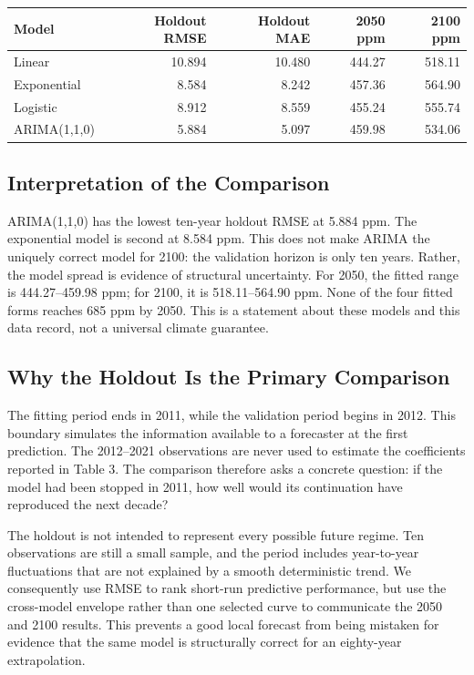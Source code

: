\documentclass{mcmthesis}
\begin{document}
\begin{table}[H]
\centering
\small
\begin{tabularx}{\textwidth}{lrrrr}
\toprule
Model & Holdout RMSE & Holdout MAE & 2050 ppm & 2100 ppm \\ \midrule
\midrule
Linear & 10.894 & 10.480 & 444.27 & 518.11 \\
Exponential & 8.584 & 8.242 & 457.36 & 564.90 \\
Logistic & 8.912 & 8.559 & 455.24 & 555.74 \\
ARIMA(1,1,0) & 5.884 & 5.097 & 459.98 & 534.06 \\
\bottomrule
\end{tabularx}
\end{table}


\subsection{Interpretation of the Comparison}
ARIMA(1,1,0) has the lowest ten-year holdout RMSE at 5.884 ppm. The exponential model is second at 8.584 ppm. This does not make ARIMA the uniquely correct model for 2100: the validation horizon is only ten years. Rather, the model spread is evidence of structural uncertainty. For 2050, the fitted range is 444.27--459.98 ppm; for 2100, it is 518.11--564.90 ppm. None of the four fitted forms reaches 685 ppm by 2050. This is a statement about these models and this data record, not a universal climate guarantee.

\subsection{Why the Holdout Is the Primary Comparison}
The fitting period ends in 2011, while the validation period begins in 2012. This boundary simulates the information available to a forecaster at the first prediction. The 2012--2021 observations are never used to estimate the coefficients reported in Table 3. The comparison therefore asks a concrete question: if the model had been stopped in 2011, how well would its continuation have reproduced the next decade?

The holdout is not intended to represent every possible future regime. Ten observations are still a small sample, and the period includes year-to-year fluctuations that are not explained by a smooth deterministic trend. We consequently use RMSE to rank short-run predictive performance, but use the cross-model envelope rather than one selected curve to communicate the 2050 and 2100 results. This prevents a good local forecast from being mistaken for evidence that the same model is structurally correct for an eighty-year extrapolation.
\end{document}
